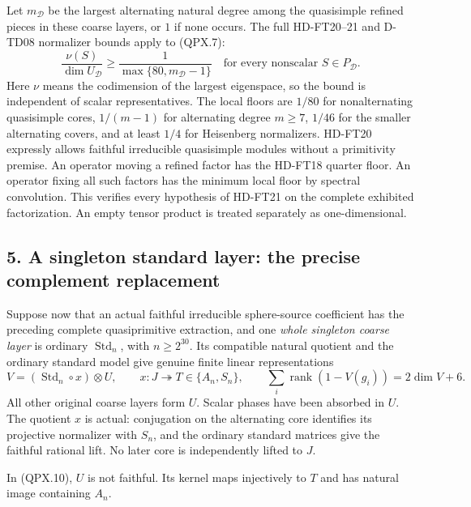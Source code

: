 Let \(m_{\mathscr D}\) be the largest alternating natural
degree among the quasisimple refined pieces in these coarse
layers, or \(1\) if none occurs. The full HD-FT20--21 and
D-TD08 normalizer bounds apply to (QPX.7):
\[
 \frac{\nu(S)}{\dim U_{\mathscr D}}
 \ge \frac1{\max\{80,m_{\mathscr D}-1\}}
 \quad\text{for every nonscalar }S\in P_{\mathscr D}.
 \tag{QPX.9}
\]
Here \(\nu\) means the codimension of the largest eigenspace,
so the bound is independent of scalar representatives.
The local floors are \(1/80\) for nonalternating quasisimple
cores, \(1/(m-1)\) for alternating degree \(m\ge7\), \(1/46\)
for the smaller alternating covers, and at least \(1/4\)
for Heisenberg normalizers. HD-FT20 expressly allows faithful
irreducible quasisimple modules without a primitivity premise.
An operator moving a refined factor has the HD-FT18 quarter
floor. An operator fixing all such factors has the minimum
local floor by spectral convolution. This verifies every
hypothesis of HD-FT21 on the complete exhibited factorization.
An empty tensor product is treated separately as one-dimensional.

\subsection*{5. A singleton standard layer: the precise complement replacement}

Suppose now that an actual faithful irreducible sphere-source
coefficient has the preceding complete quasiprimitive extraction,
and one \emph{whole singleton coarse layer} is ordinary
\(\operatorname{Std}_n\), with \(n\ge2^{30}\).
Its compatible natural quotient and the ordinary standard model
give genuine finite linear representations
\[
 V=(\operatorname{Std}_n\circ x)\otimes U,\qquad
 x:J\twoheadrightarrow T\in\{A_n,S_n\},\qquad
 \sum_i\operatorname{rank}(1-V(g_i))=2\dim V+6.
 \tag{QPX.10}
\]
All other original coarse layers form \(U\). Scalar phases
have been absorbed in \(U\). The quotient \(x\) is actual:
conjugation on the alternating core identifies its projective
normalizer with \(S_n\), and the ordinary standard matrices
give the faithful rational lift. No later core is independently
lifted to \(J\).

\begin{lemma}
In (QPX.10), \(U\) is not faithful. Its kernel maps
injectively to \(T\) and has natural image containing \(A_n\).
\end{lemma}


